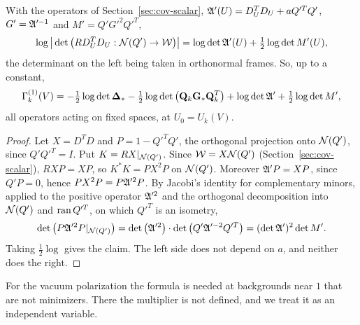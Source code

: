 \begin{corollary}\label{cor:ol-ghost}
With the operators of Section~\ref{sec:cov-scalar}, $\mathfrak A'(U)=D_U^TD_U+aQ'^TQ'$, $G'=\mathfrak A'^{-1}$ and $M'=Q'G'^2Q'^T$,
\[
\log\big|\det\big(RD^T_UD_U:\mathcal N(Q')\to\mathcal W\big)\big|=\log\det\mathfrak A'(U)+\tfrac12\log\det M'(U),
\]
the determinant on the left being taken in orthonormal frames. So, up to a constant,
\[
\Gamma^{(1)}_k(V)=-\tfrac12\log\det\boldsymbol{\Delta}_*-\tfrac12\log\det\big(\mathbf Q_k\mathbf G_*\mathbf Q_k^T\big)+\log\det\mathfrak A'+\tfrac12\log\det M',
\]
all operators acting on fixed spaces, at $U_0=U_k(V)$.
\end{corollary}

\begin{proof}
Let $X=D^TD$ and $P=1-Q'^TQ'$, the orthogonal projection onto $\mathcal N(Q')$, since $Q'Q'^T=I$. Put $K=RX|_{\mathcal N(Q')}$. Since $\mathcal W=X\mathcal N(Q')$ (Section~\ref{sec:cov-scalar}), $RXP=XP$, so $K^*K=PX^2P$ on $\mathcal N(Q')$. Moreover $\mathfrak A'P=XP$, since $Q'P=0$, hence $PX^2P=P\mathfrak A'^2P$. By Jacobi's identity for complementary minors, applied to the positive operator $\mathfrak A'^2$ and the orthogonal decomposition into $\mathcal N(Q')$ and $\operatorname{ran} Q'^T$, on which $Q'^T$ is an isometry,
\[
\det\big(P\mathfrak A'^2P|_{\mathcal N(Q')}\big)=\det\big(\mathfrak A'^2\big)\cdot\det\big(Q'\mathfrak A'^{-2}Q'^T\big)=(\det\mathfrak A')^2\det M'.
\]
Taking $\frac12\log$ gives the claim. The left side does not depend on $a$, and neither does the right.
\end{proof}

For the vacuum polarization the formula is needed at backgrounds near $1$ that are not minimizers. There the multiplier is not defined, and we treat it as an independent variable.


